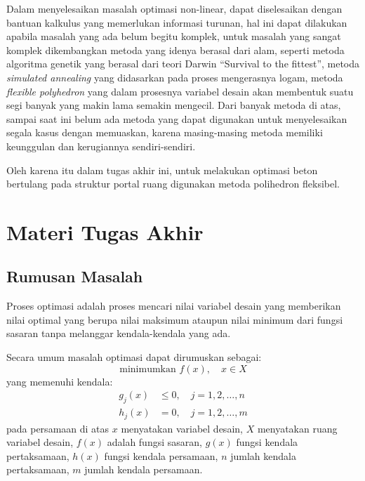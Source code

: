 Dalam menyelesaikan masalah optimasi non-linear, dapat diselesaikan dengan
bantuan kalkulus yang memerlukan informasi turunan, hal ini dapat dilakukan
apabila masalah yang ada belum begitu komplek, untuk masalah yang sangat
komplek dikembangkan metoda yang idenya berasal dari alam, seperti metoda
algoritma genetik yang berasal dari teori Darwin ``Survival to the
fittest'', metoda \textit{simulated annealing} yang didasarkan pada proses
mengerasnya logam, metoda \textit{flexible polyhedron} yang dalam prosesnya
variabel desain akan membentuk suatu segi banyak yang makin lama semakin
mengecil. Dari banyak metoda di atas, sampai saat ini belum ada metoda yang
dapat digunakan untuk menyelesaikan segala kasus dengan memuaskan, karena
masing-masing metoda memiliki keunggulan dan kerugiannya sendiri-sendiri.

Oleh karena itu dalam tugas akhir ini, untuk melakukan optimasi beton
bertulang pada struktur portal ruang digunakan metoda polihedron fleksibel.

\section{Materi Tugas Akhir}

\subsection{Rumusan Masalah}

Proses optimasi adalah proses mencari nilai variabel desain yang memberikan
nilai optimal yang berupa nilai maksimum ataupun nilai minimum dari fungsi
sasaran tanpa melanggar kendala-kendala yang ada.

Secara umum masalah optimasi dapat dirumuskan sebagai:
\begin{equation}
\text{minimumkan } f(x),\quad x \in X
\label{eq:1-1}
\end{equation}
yang memenuhi kendala:
\begin{align}
g_j(x) &\leq 0, \quad j = 1,2,\ldots,n \label{eq:1-2}\\
h_j(x) &= 0, \quad j = 1,2,\ldots,m \label{eq:1-3}
\end{align}
pada persamaan di atas $x$ menyatakan variabel desain, $X$ menyatakan ruang
variabel desain, $f(x)$ adalah fungsi sasaran, $g(x)$ fungsi kendala
pertaksamaan, $h(x)$ fungsi kendala persamaan, $n$ jumlah kendala
pertaksamaan, $m$ jumlah kendala persamaan.

